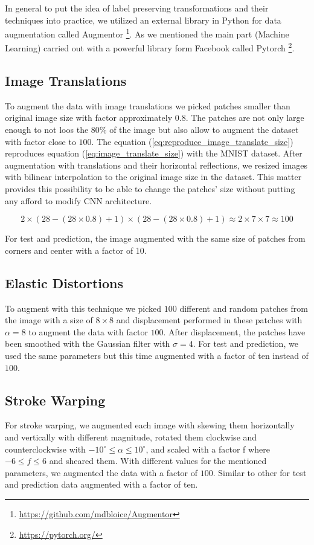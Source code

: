 In general to put the idea of label preserving transformations and their techniques
into practice, we utilized an external library in Python for data augmentation called Augmentor \footnote{\url{https://github.com/mdbloice/Augmentor}}. As
we mentioned the main part (Machine Learning) carried out with a powerful library form Facebook
called Pytorch \footnote{\url{https://pytorch.org/}}.

\subsection{Image Translations}
To augment the data with image translations we picked patches smaller than original image size with
factor approximately $0.8$. The patches are not only large enough to not loos the $80\%$ of the image but
also allow to augment the dataset with factor close to $100$. The equation
(\ref{eq:reproduce_image_translate_size}) reproduces equation (\ref{eq:image_translate_size}) with
the MNIST dataset. After augmentation with translations and their horizontal reflections, we resized images with bilinear interpolation to the original image size in the dataset. This matter provides this possibility to be able to change the patches' size without putting any afford to modify CNN architecture.

\begin{equation}
  \label{eq:reproduce_image_translate_size}
  2\times(28-(28 \times 0.8)+1)\times(28-(28 \times 0.8)+1) \approx 2 \times 7 \times 7 \approx 100
\end{equation}

For test and prediction, the image augmented with the same size of patches from corners and center
with a factor of 10.

\subsection{Elastic Distortions}
To augment with this technique we picked $100$ different and random patches from the image with a
size of $8 \times 8$ and displacement performed in these patches with $\alpha = 8$ to augment the
data with factor $100$.  After displacement, the patches have been smoothed with the Gaussian filter
with $\sigma = 4$. For test and prediction, we used the same parameters but this time augmented with
a factor of ten instead of $100$.

\subsection{Stroke Warping}
For stroke warping, we augmented each image with skewing them horizontally and vertically with
different magnitude, rotated them clockwise and counterclockwise with $-10^{\circ} \leq \alpha \leq
  10^{\circ}$, and scaled with a factor f where $-6 \leq f \leq 6$  and sheared them. With different
values for the mentioned parameters, we augmented the data with a factor of $100$. Similar to other
for test and prediction data augmented with a factor of ten.

